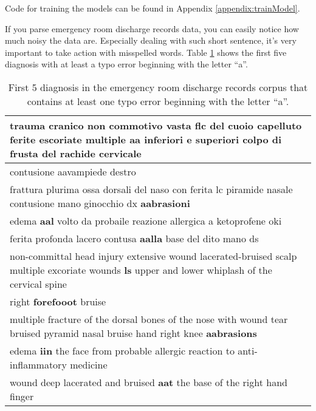 Code for training the models can be found in Appendix \ref{appendix:trainModel}.



If you parse emergency room discharge records data, you can easily notice how much noisy the data are. Especially dealing with such short sentence, it's very important to take action with misspelled words. 
Table \ref{tab:tableTypingErrors} shows the first five diagnosis with at least a typo error beginning with the letter \enquote{a}. \\

\begin{table}[h!]
	\begin{center}  
		\caption[First 5 diagnosis that contains at least one typo error beginning with the letter \enquote{a}]{First 5 diagnosis in the emergency room discharge records corpus that contains at least one typo error beginning with the letter \enquote{a}.} 
		\label{tab:tableTypingErrors}
		\begin{tabular}{|p{\linewidth}|} 
			\hline
			trauma cranico non commotivo vasta flc del cuoio capelluto ferite escoriate multiple \textbf{aa} inferiori e superiori colpo di frusta del rachide cervicale	\\ \hline
			contusione aavampiede destro	\\ \hline
			frattura plurima ossa dorsali del naso con ferita lc piramide nasale contusione mano ginocchio dx \textbf{aabrasioni}	\\ \hline
			edema \textbf{aal} volto da probaile reazione allergica a ketoprofene oki	\\ \hline
			ferita profonda lacero contusa \textbf{aalla} base del dito mano ds	\\ \hline \hline
			non-committal head injury extensive wound lacerated-bruised scalp multiple excoriate wounds \textbf{ls} upper and lower whiplash of the cervical spine	\\ \hline
			right \textbf{forefooot} bruise	\\ \hline
			multiple fracture of the dorsal bones of the nose with wound tear bruised pyramid nasal bruise hand right knee \textbf{aabrasions}	\\ \hline
			edema \textbf{iin} the face from probable allergic reaction to anti-inflammatory medicine \\ \hline
			wound deep lacerated and bruised \textbf{aat} the base of the right hand finger	\\ \hline
		\end{tabular} 
	\end{center}
\end{table}

